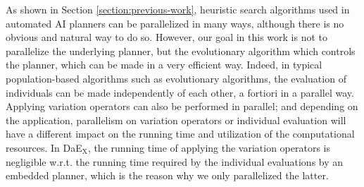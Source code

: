 \documentclass{sig-alternate}
\newcommand{\DAEX}{{\sc DaE$_{\text{X}}$}}
\newcommand{\DAEYAHSP}{{\sc DaE$_{\text{YAHSP}}$}}
\begin{document}
As  shown in  Section \ref{section:previous-work},  heuristic  search algorithms
used in automated  AI planners can be parallelized in  many ways, although there
is no obvious and  natural way to do so.  However, our goal  in this work is not
to  parallelize the  underlying planner,  but the  evolutionary  algorithm which
controls the  planner, which can  be made in  a very efficient way.   Indeed, in
typical  population-based  algorithms   such  as  evolutionary  algorithms,  the
evaluation of individuals can be made independently of each other, a fortiori in
a parallel way.  Applying variation operators can also be performed in parallel;
and  depending  on  the  application,  parallelism  on  variation  operators  or
individual  evaluation will  have a  different impact  on the  running  time and
utilization  of the  computational  resources.  In \DAEX,  the  running time  of
applying the variation operators is negligible w.r.t.  the running time required
by the individual evaluations by an embedded planner, which is the reason why we
only parallelized the latter.


\end{document}
